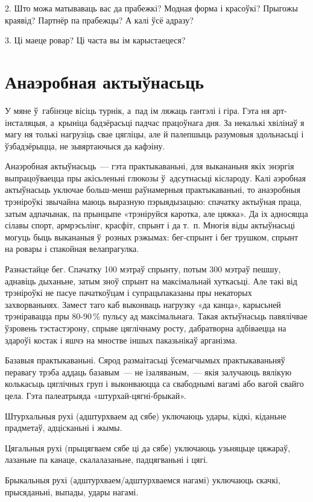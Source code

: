 2. Што можа матываваць вас да прабежкі? Модная форма і красоўкі? Прыгожы краявід? Партнёр па прабежцы? А калі ўсё адразу?

3. Ці маеце ровар? Ці часта вы ім карыстаецеся?


\section{Анаэробная актыўнасьць}

У мяне ў~габінэце вісіць турнік, а~пад ім ляжаць гантэлі і гіра. Гэта ня арт-інсталяцыя, а~крыніца бадзёрасьці падчас працоўнага дня. За некалькі хвілінаў я магу ня толькі нагрузіць свае цягліцы, але й палепшыць разумовыя здольнасьці і ўзбадзёрыцца, не зьвяртаючыся да кафэіну.

Анаэробная актыўнасьць~--- гэта практыкаваньні, для выкананьня якіх энэргія выпрацоўваецца пры акісьленьні глюкозы ў~адсутнасьці кіслароду. Калі аэробная актыўнасьць уключае больш-менш раўнамерныя практыкаваньні, то анаэробныя трэніроўкі звычайна маюць выразную пэрыядызацыю: спачатку актыўная праца, затым адпачынак, па прынцыпе «трэніруйся каротка, але цяжка». Да іх адносяцца сілавы спорт, армрэсьлінг, красфіт, спрынт і да т.~п. Многія віды актыўнасьці могуць быць выкананыя ў~розных рэжымах: бег-спрынт і бег трушком, спрынт на ровары і спакойная велапрагулка.

Разнастайце бег. Спачатку 100 мэтраў спрынту, потым 300 мэтраў пешшу, аднавіць дыханьне, затым зноў спрынт на максімальнай хуткасьці. Але такі від трэніроўкі не пасуе пачаткоўцам і супрацьпаказаны пры некаторых захворваньнях. Замест таго каб выконваць нагрузку «да канца», карысьней трэніравацца пры 80-90\,\% пульсу ад максімальнага. Такая актыўнасьць павялічвае ўзровень тэстастэрону, спрыяе цяглічнаму росту, дабратворна адбіваецца на здароўі костак і яшчэ на мностве іншых паказьнікаў арганізма.

Базавыя практыкаваньні. Сярод размаітасьці ўсемагчымых практыкаваньняў перавагу трэба аддаць базавым~--- не ізаляваным,~--- якія залучаюць вялікую колькасьць цяглічных груп і выконваюцца са свабоднымі вагамі або вагой свайго цела. Гэта палеатрыяда «штурхай-цягні-брыкай». 

Штурхальныя рухі (адштурхваем ад сябе) уключаюць удары, кідкі, кіданьне прадметаў, адцісканьні і жымы. 

Цягальныя рухі (прыцягваем сябе ці да сябе) уключаюць узьняцьце цяжараў, лазаньне па канаце, скалалазаньне, падцягваньні і цягі. 

Брыкальныя рухі (адштурхваем/адштурхваемся нагамі) уключаюць скачкі, прысяданьні, выпады, удары нагамі. 

